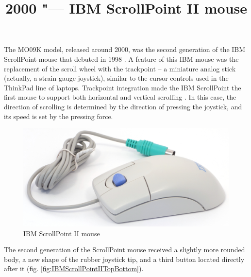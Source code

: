 \documentclass[11pt, a4paper]{article}
\begin{document}
\title{2000 "--- IBM ScrollPoint II mouse}
\date{}
\maketitle
{}
The MO09K model, released around 2000, was the second generation of the IBM ScrollPoint mouse that debuted in 1998 \cite{hist}. A feature of this IBM mouse was the replacement of the scroll wheel with the trackpoint -- a miniature analog stick (actually, a strain gauge joystick), similar to the cursor controls used in the ThinkPad line of laptops. Trackpoint integration made the IBM ScrollPoint the first mouse to support both horizontal and vertical scrolling \cite{buxtonG1}. In this case, the direction of scrolling is determined by the direction of pressing the joystick, and its speed is set by the pressing force.

\begin{figure}[h]
    \centering
    \includegraphics[scale=0.65]{2000_ibm_scrollpoint_ii_mouse/pic_30.jpg}
    \caption{IBM ScrollPoint II mouse}
    \label{fig:IBMScrollPointIIPic}
\end{figure}

The second generation of the ScrollPoint mouse received a slightly more rounded body, a new shape of the rubber joystick tip, and a third button located directly after it (fig. \ref{fig:IBMScrollPointIITopBottom}).
\end{document}
